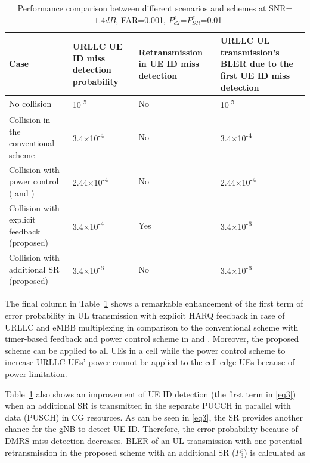 \documentclass{report}
\begin{document}
\begin{table}[htbp]
\caption{Performance comparison between different scenarios and schemes at SNR=$-1.4dB$, FAR=0.001, $P^{e}_{d2}$=$P^{e}_{SR}$=0.01}
\begin{center}
\begin{tabular}{|p{14em}|p{7em}|p{10em}|p{10em}|}
 \hline
 \textbf{Case} & \textbf{URLLC UE ID miss detection probability}& \textbf{Retransmission in UE ID miss detection}& \textbf{URLLC UL transmission's BLER due to the first UE ID miss detection}\\
 \hline
 No collision  & 10\textsuperscript{-5}&No&10\textsuperscript{-5}\\
 \hline
 Collision in the conventional scheme& 3.4$\times$10\textsuperscript{-4}&No&3.4$\times$10\textsuperscript{-4}\\
 \hline
 Collision with power control (\cite{ad4} and \cite{ad5})&2.44$\times$10\textsuperscript{-4}&No&2.44$\times$10\textsuperscript{-4}\\
 \hline
 Collision with explicit feedback (proposed)& 3.4$\times$10\textsuperscript{-4}&Yes&3.4$\times$10\textsuperscript{-6}\\
\hline
 Collision with additional SR (proposed)& 3.4$\times$10\textsuperscript{-6}&No&3.4$\times$10\textsuperscript{-6}\\

 
 \hline
\end{tabular}
\label{tab2}
\end{center}

\end{table}

The final column in Table~\ref{tab2} shows a remarkable enhancement of the first term of error probability in UL transmission with explicit HARQ feedback in case of URLLC and eMBB multiplexing in comparison to the conventional scheme with timer-based feedback and power control scheme in \cite{ad4} and \cite{ad5}. Moreover, the proposed scheme can be applied to all UEs in a cell while the power control scheme to increase URLLC UEs' power cannot be applied to the cell-edge UEs because of power limitation. 

Table~\ref{tab2} also shows an improvement of UE ID detection (the first term in \eqref{eq3}) when an additional SR is transmitted in the separate PUCCH in parallel with data (PUSCH) in CG resources. As can be seen in \eqref{eq3}, the SR provides another chance for the gNB to detect UE ID. Therefore, the error probability because of DMRS miss-detection decreases. BLER of an UL transmission with one potential retransmission in the proposed scheme with an additional SR ($ P^{e}_{3}$) is calculated as\useshortskip
\end{document}
